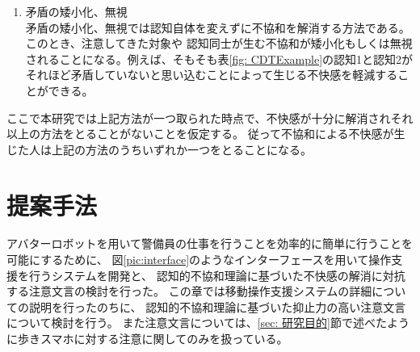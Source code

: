 \documentclass{kuisthesis}
\begin{document}
\begin{enumerate}
\begin{table}[H]
\end{table}

  \item 矛盾の矮小化、無視 \\
  矛盾の矮小化、無視では認知自体を変えずに不協和を解消する方法である。このとき、注意してきた対象や
  認知同士が生む不協和が矮小化もしくは無視されることになる。例えば、そもそも表\ref{fig: CDTExample}の認知1と認知2が
それほど矛盾していないと思い込むことによって生じる不快感を軽減することができる。

\end{enumerate}
\vspace{5mm}
ここで本研究では上記方法が一つ取られた時点で、不快感が十分に解消されそれ以上の方法をとることがないことを仮定する。
従って不協和による不快感が生じた人は上記の方法のうちいずれか一つをとることになる。



\section{提案手法}
アバターロボットを用いて警備員の仕事を行うことを効率的に簡単に行うことを可能にするために、
図\ref{pic:interface}のようなインターフェースを用いて操作支援を行うシステムを開発と、
認知的不協和理論\cite{Festinger1957}に基づいた不快感の解消に対抗する注意文言の検討を行った。
この章では移動操作支援システムの詳細についての説明を行ったのちに、
認知的不協和理論に基づいた抑止力の高い注意文言について検討を行う。
また注意文言については、\ref{sec: 研究目的}節で述べたように歩きスマホに対する注意に関してのみを扱っている。
\end{document}
